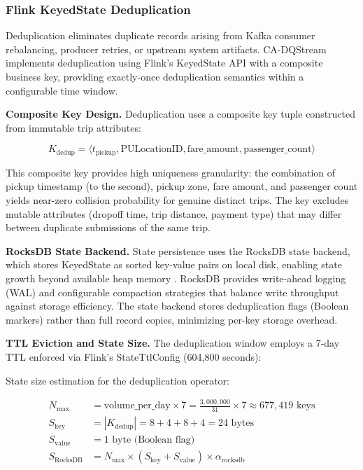 \subsubsection{Flink KeyedState Deduplication}

Deduplication eliminates duplicate records arising from Kafka consumer rebalancing, producer retries, or upstream system artifacts. CA-DQStream implements deduplication using Flink's KeyedState API with a composite business key, providing exactly-once deduplication semantics within a configurable time window.

\textbf{Composite Key Design.} Deduplication uses a composite key tuple constructed from immutable trip attributes:

\begin{equation}
K_{\text{dedup}} = \langle t_{\text{pickup}}, \text{PULocationID}, \text{fare\_amount}, \text{passenger\_count} \rangle
\label{eq:dedup_key}
\end{equation}

This composite key provides high uniqueness granularity: the combination of pickup timestamp (to the second), pickup zone, fare amount, and passenger count yields near-zero collision probability for genuine distinct trips. The key excludes mutable attributes (dropoff time, trip distance, payment type) that may differ between duplicate submissions of the same trip.

\textbf{RocksDB State Backend.} State persistence uses the RocksDB state backend, which stores KeyedState as sorted key-value pairs on local disk, enabling state growth beyond available heap memory \citep{flink_rocksdb}. RocksDB provides write-ahead logging (WAL) and configurable compaction strategies that balance write throughput against storage efficiency. The state backend stores deduplication flags (Boolean markers) rather than full record copies, minimizing per-key storage overhead.

\textbf{TTL Eviction and State Size.} The deduplication window employs a 7-day TTL enforced via Flink's StateTtlConfig (604,800 seconds):

State size estimation for the deduplication operator:

\begin{align}
N_{\text{max}} &= \text{volume\_per\_day} \times 7 = \frac{3{,}000{,}000}{31} \times 7 \approx 677{,}419 \text{ keys} \label{eq:state_count} \\
S_{\text{key}} &= |K_{\text{dedup}}| = 8 + 4 + 8 + 4 = 24 \text{ bytes} \label{eq:key_size} \\
S_{\text{value}} &= 1 \text{ byte (Boolean flag)} \label{eq:value_size} \\
S_{\text{RocksDB}} &= N_{\text{max}} \times (S_{\text{key}} + S_{\text{value}}) \times \alpha_{\text{rocksdb}} \label{eq:rocksdb_overhead}
\end{align}

